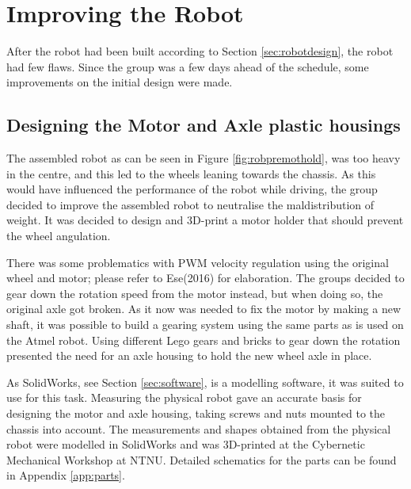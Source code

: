 \section{Improving the Robot}
After the robot had been built according to Section \ref{sec:robotdesign}, the robot had few flaws. Since the group was a few days ahead of the schedule, some improvements on the initial design were made.
\label{sec:improvements}

\subsection{Designing the Motor and Axle plastic housings}
The assembled robot as can be seen in Figure \ref{fig:robpremothold}, was too heavy in the centre, and this led to the wheels leaning towards the chassis. As this would have influenced the performance of the robot while driving, the group decided to improve the assembled robot to neutralise the maldistribution of weight. It was decided to design and 3D-print a motor holder that should prevent the wheel angulation.

There was some problematics with PWM velocity regulation using the original wheel and motor; please refer to Ese(2016) for elaboration. The groups decided to gear down the rotation speed from the motor instead, but when doing so, the original axle got broken. As it now was needed to fix the motor by making a new shaft, it was possible to build a gearing system using the same parts as is used on the Atmel robot. Using different Lego gears and bricks to gear down the rotation presented the need for an axle housing to hold the new wheel axle in place.

As SolidWorks, see Section \ref{sec:software}, is a modelling software, it was suited to use for this task. Measuring the physical robot gave an accurate basis for designing the motor and axle housing, taking screws and nuts mounted to the chassis into account. The measurements and shapes obtained from the physical robot were modelled in SolidWorks and was 3D-printed at the Cybernetic Mechanical Workshop at NTNU. Detailed schematics for the parts can be found in Appendix \ref{app:parts}.



